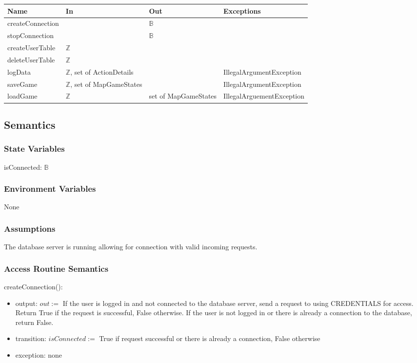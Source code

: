 \documentclass[12pt, titlepage]{article}
\begin{document}
\begin{center}
\begin{tabular}{p{4cm} p{4cm} p{4cm} p{2cm}}
\hline
\textbf{Name} & \textbf{In} & \textbf{Out} & \textbf{Exceptions} \\
\hline
createConnection &   & $\mathbb{B}$ & \\
\hline
stopConnection &   & $\mathbb{B}$ & \\
\hline
createUserTable & $\mathbb{Z}$ &  &  \\
\hline
deleteUserTable & $\mathbb{Z}$ &  &  \\
\hline
logData & $\mathbb{Z}$, set of ActionDetails  &  & IllegalArgumentException\\
\hline
saveGame & $\mathbb{Z}$, set of MapGameStates &  & IllegalArgumentException \\
\hline
loadGame & $\mathbb{Z}$ & set of MapGameStates & IllegalArguementException \\
\hline
\end{tabular}
\end{center}

\subsection{Semantics}

\subsubsection{State Variables}
isConnected: $\mathbb{B}$
\subsubsection{Environment Variables}
None
\subsubsection{Assumptions}
The database server is running allowing for connection with valid incoming requests.

\subsubsection{Access Routine Semantics}

\noindent createConnection():
\begin{itemize}
\item output: $out :=$ If the user is logged in and not connected to the database server, send a request to using CREDENTIALS for access. Return True if the request is successful, False otherwise. If the user is not logged in or there is already a connection to the database, return False.
\item transition: $isConnected := $ True if request successful or there is already a connection, False otherwise
\item exception: none
\end{itemize}
\end{document}
